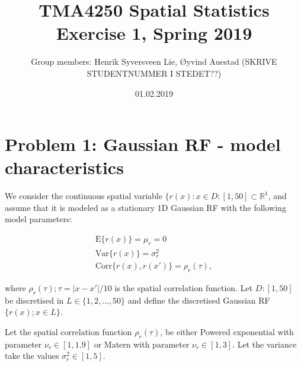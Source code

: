 \documentclass[]{article}
\title{TMA4250 Spatial Statistics Exercise 1, Spring 2019}
\subtitle{Group members: Henrik Syversveen Lie, Øyvind Auestad (SKRIVE
STUDENTNUMMER I STEDET??)}
\author{}
\date{01.02.2019}
\begin{document}
\maketitle

{
\setcounter{tocdepth}{2}
\tableofcontents
}
\section{Problem 1: Gaussian RF - model
characteristics}\label{problem-1-gaussian-rf---model-characteristics}

We consider the continuous spatial variable
\(\{r(x):x\in D : [1,50] \subset \mathbb{R}^1\), and assume that it is
modeled as a stationary 1D Gaussian RF with the following model
parameters:

\begin{gather*}
\text{E}\{r(x)\} = \mu_r = 0\\
\text{Var}\{r(x)\} = \sigma_r^2\\
\text{Corr}\{r(x), r(x')\} = \rho_r(\tau),
\end{gather*}

where \(\rho_r(\tau); \tau = |x−x'|/10\) is the spatial correlation
function. Let \(D : [1, 50]\) be discretised in
\(L \in \{1, 2, . . . , 50\}\) and define the discretised Gaussian RF
\(\{r(x); x \in L\}\).

Let the spatial correlation function \(\rho_r(\tau)\), be either Powered
exponential with parameter \(\nu_r \in [1, 1.9]\) or Matern with
parameter \(\nu_r \in [1, 3]\). Let the variance take the values
\(\sigma_r^2 \in [1, 5]\).
\end{document}
